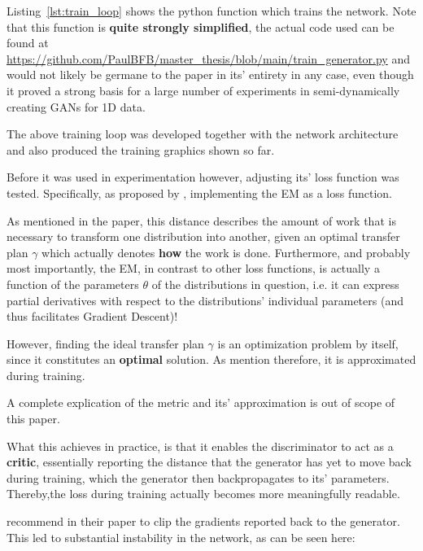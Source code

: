 Listing~\ref{lst:train_loop} shows the python function which trains the network. Note that this function is \textbf{quite strongly simplified}, 
the actual code used can be found at \url{https://github.com/PaulBFB/master_thesis/blob/main/train_generator.py} and would not likely be germane to the paper in its' entirety in any case, even though it proved a strong basis for a large number of experiments in semi-dynamically creating \acp{GAN} for 1D data.

\pagebreak

The above training loop was developed together with the network architecture and also produced the training graphics shown so far. 

Before it was used in experimentation however, adjusting its' loss function was tested.
Specifically, as proposed by \cite{arjovsky2017wasserstein}, implementing the \ac{EM} as a loss function. 


As mentioned in the paper, this distance describes the amount of work that is necessary to transform one distribution into another, given an optimal transfer plan $\gamma$ which actually denotes \textbf{how} the work is done.
Furthermore, and probably most importantly, the \ac{EM}, in contrast to other loss functions, is actually a function of the parameters $\theta$ of the distributions in question, i.e. it can express partial derivatives with respect to the distributions' individual parameters (and thus facilitates Gradient Descent)!

However, finding the ideal transfer plan $\gamma$ is an optimization problem by itself, since it constitutes an \textbf{optimal} solution. As \cite{arjovsky2017wasserstein} mention therefore, it is approximated during training.

A complete explication of the metric and its' approximation is out of scope of this paper.

What this achieves in practice, is that it enables the discriminator to act as a \textbf{critic}, essentially reporting the distance that the generator has yet to move back during training, 
which the generator then backpropagates to its' parameters. Thereby,the loss during training actually becomes more meaningfully readable.

\pagebreak

\cite{arjovsky2017wasserstein} recommend in their paper to clip the gradients reported back to the generator. This led to substantial instability in the network, as can be seen here:

